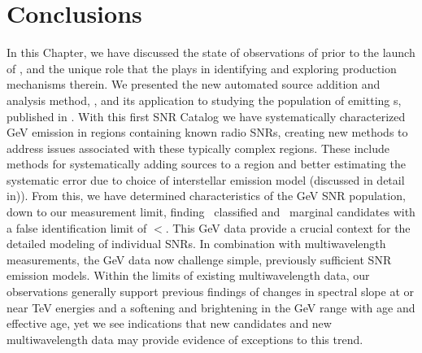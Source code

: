 \section{Conclusions}\label{snrcat:Conclusions}
In this Chapter, we have discussed the state of \gam{} observations of \snrs{} prior to the launch of \Fermi{}, and the unique role that the \lat{} plays in identifying \snrs{} and exploring \gam{} production mechanisms therein. We presented the new automated source addition and analysis method, \srcs{}, and its application to studying the population of \snrs{} emitting\gev{} \gam{}s, published in \cite{snrCat}. With this first \FermiLat{} SNR Catalog we have systematically characterized GeV emission in regions containing known radio SNRs, creating new methods to address issues associated with these typically complex regions. These include methods for systematically adding sources to a region and better estimating the systematic error due to choice of interstellar emission model (discussed in detail in)\cite{snrCat}). From this, we have determined characteristics of the GeV SNR population, down to our measurement limit, finding \nclassifiedsnrs~classified and \nmarginal~marginal candidates with a false identification limit of $< $\nninetyfivemockpercent  \citep{snrCat}. This GeV data provide a crucial context for the detailed modeling of individual SNRs. In combination with multiwavelength measurements, the GeV data now challenge simple, previously sufficient SNR emission models. Within the limits of existing multiwavelength data, our observations generally support previous findings of changes in spectral slope at or near TeV energies and a softening and brightening in the GeV range with age and effective age, yet we see indications that new candidates and new multiwavelength data may provide evidence of exceptions to this trend. %


